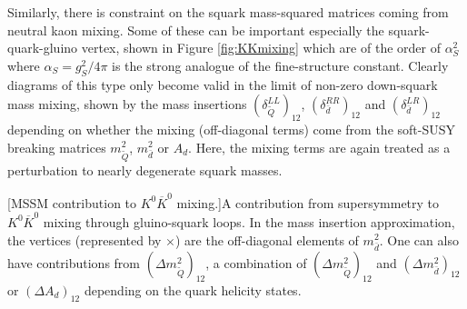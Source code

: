 \begin{enumerate}
\begin{enumerate*}
Similarly, there is constraint on the squark mass-squared matrices coming from neutral kaon mixing. Some of these can be important especially the squark-quark-gluino vertex, shown in Figure \ref{fig:KKmixing} which are of the order of $\alpha^2_S$ where $\alpha_S=g^2_S/4\pi$ is the strong analogue of the fine-structure constant. Clearly diagrams of this type only become valid in the limit of non-zero down-squark mass mixing, shown by the mass insertions $(\delta^{LL}_{\tilde{Q}})_{12}$, $(\delta^{RR}_{\bar{d}})_{12}$ and $(\delta^{LR}_{\bar{d}})_{12}$ depending on whether the mixing (off-diagonal terms) come from the soft-SUSY breaking matrices $m^2_{\tilde{Q}}$, $m^2_{\bar{d}}$ or $A_d$. Here, the mixing terms are again treated as a perturbation to nearly degenerate squark masses.
\begin{center}
\vspace{5mm}
[MSSM contribution to $K^{0}\overline{K}^{0}$ mixing.]{A contribution from supersymmetry to $K^{0}\overline{K}^{0}$ mixing through gluino-squark loops. In the mass insertion approximation, the vertices (represented by $\times$) are the off-diagonal elements of $m^2_{\bar{d}}$. One can also have contributions from $(\Delta m^2_{\tilde{Q}})_{12}$, a combination of $(\Delta m^2_{\tilde{Q}})_{12}$ and $(\Delta m^2_{\bar{d}})_{12}$ or $(\Delta A_d)_{12}$ depending on the quark helicity states.}

\end{center}
\end{enumerate*}
\end{enumerate}
